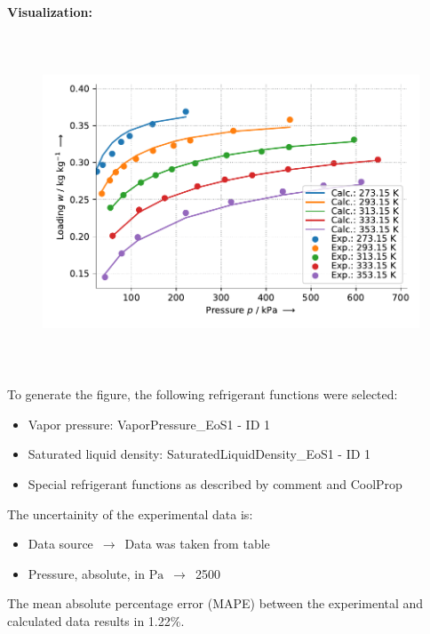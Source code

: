 \textbf{Visualization:}
%
\begin{figure}[!htp]
{\noindent\includegraphics[height=10cm, keepaspectratio]{figs/ads/ads_R-134a_activated_charcoal_pellet_Chemviron_DubininAstakhov_1.pdf}}
\end{figure}
%

To generate the figure, the following refrigerant functions were selected:
\begin{itemize}
\item Vapor pressure: VaporPressure\_EoS1 - ID 1
\item Saturated liquid density: SaturatedLiquidDensity\_EoS1 - ID 1
\item Special refrigerant functions as described by comment and CoolProp
\end{itemize}

The uncertainity of the experimental data is:
\begin{itemize}
\item Data source $\,\to\,$ Data was taken from table
\item Pressure, absolute, in $\si{\pascal}$ $\,\to\,$ 2500
\end{itemize}

The mean absolute percentage error (MAPE) between the experimental and calculated data results in 1.22\%.
\FloatBarrier
\newpage
